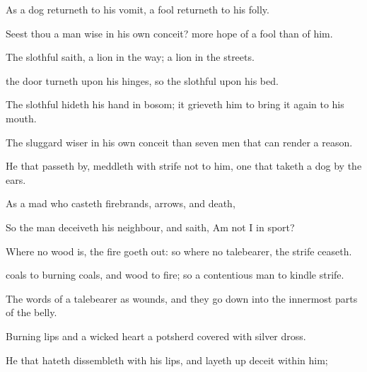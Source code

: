 {As a
dog
returneth to his
vomit,
{} a
fool
returneth to his
folly.

Seest thou a
man
wise in his own
conceit?
{} more
hope of a
fool than of him.

The
slothful
{}
saith,
{} a
lion in the
way; a
lion
{} in the
streets.

 the
door
turneth upon his
hinges, so
{} the
slothful upon his
bed.

The
slothful
hideth his
hand in
{}
bosom; it
grieveth him to bring it
again to his
mouth.

The
sluggard
{}
wiser in his own
conceit than seven
men that can
render a
reason.

He that passeth
by,
{}
meddleth with
strife
{} not to him,
{} one that
taketh a
dog by the
ears.


\par }{\PP {}As a
mad
{} who
casteth
firebrands,
arrows, and
death,

So
{} the
man
{}
deceiveth his
neighbour, and
saith, Am not I in
sport?


\par }{\PP {}Where
no
wood is,
{} the
fire goeth
out: so where
{} no
talebearer, the
strife
ceaseth.

coals
{} to burning
coals, and
wood to
fire; so
{} a
contentious
man to
kindle
strife.

The
words of a
talebearer
{} as
wounds, and they go
down into the innermost
parts of the
belly.

Burning
lips and a
wicked
heart
{} a
potsherd
covered with
silver
dross.


\par }{\PP {}He that
hateth
dissembleth with his
lips, and layeth
up
deceit
within him;

}
